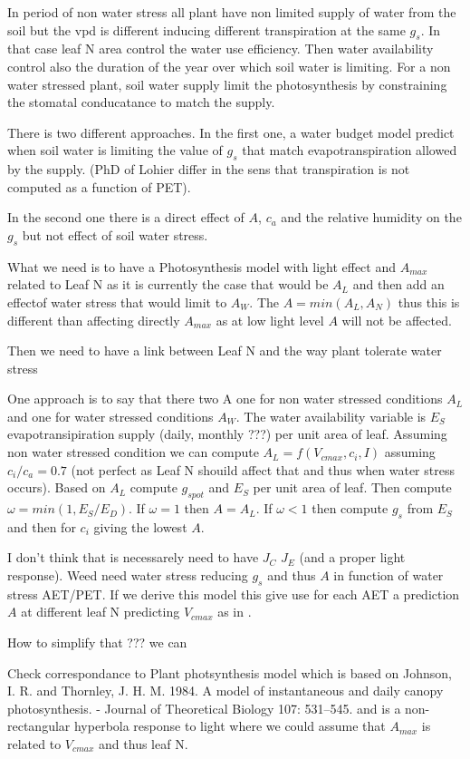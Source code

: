 \documentclass[a4paper,11pt]{article}
\begin{document}
In period of non water stress all plant have non limited supply of
water from the soil but the vpd is different inducing different
transpiration at the same $g_s$. In that case leaf N area control the
water use efficiency. Then water availability control also
the duration of the year over which soil water is limiting. For a non water
stressed plant, soil water supply limit the photosynthesis by
constraining the stomatal conducatance to match the supply.



There is two different approaches. In the first one, a water budget model
predict when soil water is limiting the value of $g_s$ that match
evapotranspiration allowed by the supply. (PhD of Lohier differ in the
sens that transpiration is not computed as a function of PET).

In the second one there is a direct effect of $A$, $c_a$ and the
relative humidity on the $g_s$ but not effect of soil water stress.

What we need is to have a Photosynthesis model with light effect and
$A_{max}$ related to Leaf N as it is currently the case that would be
$A_L$ and then add an effectof water stress that would limit to
$A_W$. The $A = min(A_L , A_N)$ thus this is different than affecting
directly $A_{max}$ as at low light level $A$ will not be affected.

Then we need to have a link between Leaf N and the way plant tolerate
water stress


One approach is to say that there two A one for non water stressed
conditions $A_L$ and one for water stressed conditions $A_W$. The
water availability variable is $E_S$ evapotransipiration supply
(daily, monthly ???) per unit area of leaf. Assuming non water
stressed condition we can
compute $A_L = f(V_{cmax}, c_i, I)$ assuming $c_i/c_a = 0.7$ (not
perfect as Leaf N shouild affect that and thus when water stress
occurs). Based on $A_L$ compute $g_{s pot}$ and $E_S$ per unit area of
leaf. Then compute $\omega = min(1, E_S/E_D)$. If $\omega = 1$ then $A
= A_L$. If $\omega < 1$ then compute $g_s$ from $E_S$ and then for
$c_i$ giving the lowest $A$.



I don't think that is necessarely need to have $J_C$ $J_E$ (and a
proper light response). Weed need water stress reducing $g_s$ and thus $A$ in function of water stress AET/PET. If we derive this model this give use for each AET a prediction $A$ at different leaf N predicting $V_{cmax}$ as in \citet{Sakschewski-2015}.

How to simplify that ??? we can


Check correspondance to Plant photsynthesis model which is based on Johnson, I. R. and Thornley, J. H. M. 1984. A model of instantaneous and daily canopy photosynthesis. - Journal of Theoretical Biology 107: 531–545.
 and is a non-rectangular hyperbola response to light where we could assume that $A_{max}$ is related to $V_{cmax}$ and thus leaf N.






\end{document}

